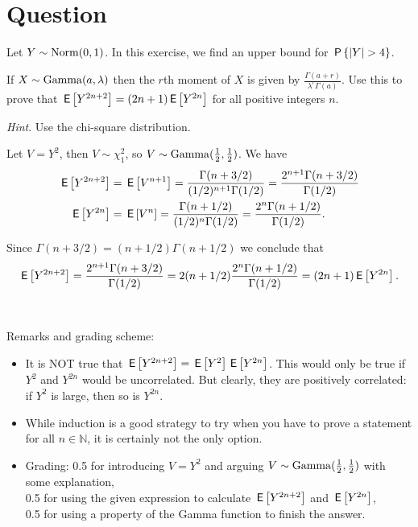 \section*{Question}

Let $Y \sim \Norm{0,1}$. 
In this exercise, we find an upper bound for $\P{|Y| > 4}$.

\begin{exercise}[1.5]
If $X \sim \Gamm{a, \lambda}$ then the $r$th moment of $X$ is given by $\frac{\Gamma(a+r)}{\lambda^r\Gamma(a)}$. 
Use this to prove that  $\E{Y^{2n+2}} = (2n+1)\E{Y^{2n}}$ for all positive integers $n$.

\textit{Hint}. Use the chi-square distribution. \\
\begin{solution}
Let $V = Y^2$, then  $V \sim \chi^2_1$, so $V  \sim \Gamm{\tfrac12, \tfrac12}$. We have 
\begin{align*} \E{Y^{2n+2}} &= \E{V^{n+1}} =  \frac{\Gamma(n+3/2)}{(1/2)^{n+1}\Gamma(1/2)} = \frac{2^{n+1}\Gamma(n+3/2)}{\Gamma(1/2)} \\ 
  \E{Y^{2n}} &= \E{V^n}  =  \frac{\Gamma(n+1/2)}{(1/2)^n\Gamma(1/2)} = \frac{2^n\Gamma(n+1/2)}{\Gamma(1/2)}. \end{align*}

Since $\Gamma(n+3/2) = (n+1/2) \Gamma(n+1/2)$ we conclude that $$\E{Y^{2n+2}}  = \frac{2^{n+1}\Gamma(n+3/2)}{\Gamma(1/2)} = 2(n+1/2)\frac{2^n\Gamma(n+1/2)}{\Gamma(1/2)} = (2n+1)\E{Y^{2n}}.$$  \\ \\

\noindent Remarks and grading scheme:

\begin{itemize}
\item It is NOT true that $\E{Y^{2n+2}} = \E{Y^{2}}\E{Y^{2n}}$. This would only be true if $Y^2$ and $Y^{2n}$ would be uncorrelated. But clearly, they are positively correlated: if $Y^2$ is large, then so is $Y^{2n}$.
\item While induction is a good strategy to try when you have to prove a statement for all $n \in \mathbb N$, it is certainly not the only option. 
\item Grading: 0.5 for introducing $V = Y^2$ and arguing $V  \sim \Gamm{\tfrac12, \tfrac12}$ with some explanation, \\ 0.5 for using the given expression to calculate  $\E{Y^{2n+2}}$ and $\E{Y^{2n}}$, \\
 0.5 for using a property of the Gamma function to finish the answer.
\end{itemize}
\end{solution}
\end{exercise}

